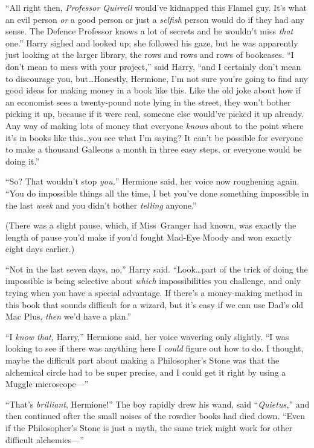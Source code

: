 “All right then, \emph{Professor Quirrell} would’ve kidnapped this Flamel guy. It’s what an evil person \emph{or} a good person or just a \emph{selfish} person would do if they had any sense. The Defence Professor knows a lot of secrets and he wouldn’t miss \emph{that} one.” Harry sighed and looked up; she followed his gaze, but he was apparently just looking at the larger library, the rows and rows and rows of bookcases. “I don’t mean to mess with your project,” said Harry, “and I certainly don’t mean to discourage you, but…Honestly, Hermione, I’m not sure you’re going to find any good ideas for making money in a book like this. Like the old joke about how if an economist sees a twenty-pound note lying in the street, they won’t bother picking it up, because if it were real, someone else would’ve picked it up already. Any way of making lots of money that everyone \emph{knows} about to the point where it’s in books like this…you see what I’m saying? It can’t be possible for everyone to make a thousand Galleons a month in three easy steps, or everyone would be doing it.”

“So? That wouldn’t stop \emph{you,}” Hermione said, her voice now roughening again. “You do impossible things all the time, I bet you’ve done something impossible in the last \emph{week} and you didn’t bother \emph{telling} anyone.”

(There was a slight pause, which, if Miss~Granger had known, was exactly the length of pause you’d make if you’d fought Mad-Eye Moody and won exactly eight days earlier.)

“Not in the last seven days, no,” Harry said. “Look…part of the trick of doing the impossible is being selective about \emph{which} impossibilities you challenge, and only trying when you have a special advantage. If there’s a money-making method in this book that sounds difficult for a wizard, but it’s easy if we can use Dad’s old Mac Plus, \emph{then} we’d have a plan.”

“I \emph{know that,} Harry,” Hermione said, her voice wavering only slightly. “I was looking to see if there was anything here I \emph{could} figure out how to do. I thought, maybe the difficult part about making a Philosopher’s Stone was that the alchemical circle had to be super precise, and I could get it right by using a Muggle microscope—”

“That’s \emph{brilliant}, Hermione!” The boy rapidly drew his wand, said “\emph{Quietus,}” and then continued after the small noises of the rowdier books had died down. “Even if the Philosopher’s Stone is just a myth, the same trick might work for other difficult alchemies—”

